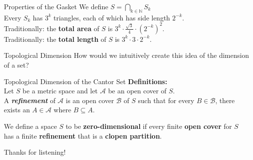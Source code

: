 \documentclass{beamer}
\begin{document}
\begin{frame}{Properties of the Gasket}
We define $S =\bigcap_{k\in\mathbb{N}}S_{k}$\\ \vspace{1em}
Every $S_{k}$ has $3^k$ triangles, each of which has side length $2^{-k}$.\\ \vspace{2em}
Traditionally: the \textbf{total area} of $S$ is $3^k \cdot \frac{\sqrt{3}}{4} \cdot (2^{-k})^2$. \\ \vspace{1em}
Traditionally: the \textbf{total length} of $S$ is $3^k \cdot 3 \cdot 2^{-k}$. \\
\end{frame}

\begin{frame}{Topological Dimension}
How would we intuitively create this idea of the dimension of a set?
\end{frame}

\begin{frame}{Topological Dimension of the Cantor Set}
\textbf{Definitions:} \\

Let $S$ be a metric space and let $\mathcal{A}$ be an open cover of $S$.\\ \vspace{1em}A \textbf{\emph{refinement}} of $\mathcal{A}$ is an open cover $\mathcal{B}$ of $S$ such that for every $B \in \mathcal{B}$, there exists an $A\in\mathcal{A}$ where $B\subseteq A$.\\ \vspace{1em}

We define a space $S$ to be \textbf{zero-dimensional} if every finite \textbf{open cover} for $S$ has a finite \textbf{refinement} that is a \textbf{clopen partition}.
\end{frame}

\begin{frame}
\begin{center}
\Huge{Thanks for listening!}
\end{center}
\end{frame}
\end{document}
